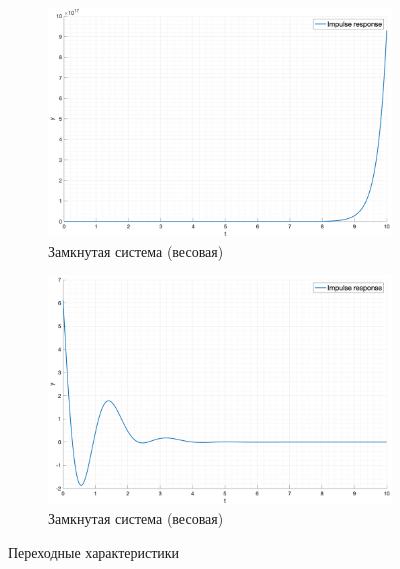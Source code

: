 \begin{figure}[ht!]
\begin{subfigure}{0.5\textwidth}
        \includegraphics[width=\textwidth]{media/plots/task3_impulse_response_open.png}
        \caption{Замкнутая система (весовая)}
        \label{fig:task3_impulse:open}
    \end{subfigure}%
    \begin{subfigure}{0.5\textwidth}
        \includegraphics[width=\textwidth]{media/plots/task3_impulse_response_closed.png}
        \caption{Замкнутая система (весовая)}
        \label{fig:task3_impulse:closed}
    \end{subfigure}
    \caption{Переходные характеристики}
    \label{fig:task3_respoces}
\end{figure}

